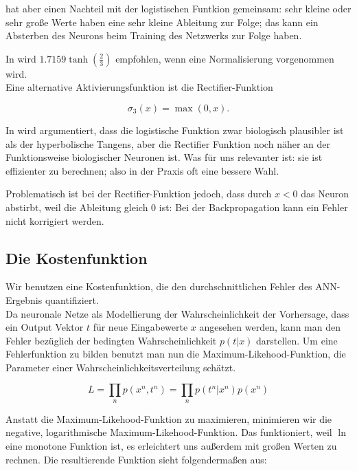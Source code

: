 hat aber einen Nachteil mit der logistischen Funtkion gemeinsam: sehr kleine oder sehr große Werte haben eine sehr kleine Ableitung zur Folge; das kann ein Absterben des Neurons beim Training des Netzwerks zur Folge haben. 

In \cite{lecunefficient} wird $1.7159 \tanh(\frac{2}{3})$ empfohlen, wenn eine Normalisierung vorgenommen wird. \\

Eine alternative Aktivierungsfunktion ist die Rectifier-Funktion 

\begin{equation}
\sigma_3(x) = \max(0,x).
\end{equation} 

In \cite{glorot2011deep} wird argumentiert, dass die logistische Funktion zwar biologisch plausibler ist als der hyperbolische Tangens, aber die Rectifier Funktion noch näher an der Funktionsweise biologischer Neuronen ist. Was für uns relevanter ist: sie ist effizienter zu berechnen; also in der Praxis oft eine bessere Wahl. 

Problematisch ist bei der Rectifier-Funktion jedoch, dass durch $x < 0$ das Neuron abstirbt, weil die Ableitung gleich 0 ist: Bei der Backpropagation kann ein Fehler nicht korrigiert werden\cite{bengio2012practical}.


\subsection{Die Kostenfunktion}
Wir benutzen eine Kostenfunktion, die den durchschnittlichen Fehler des ANN-Ergebnis quantifiziert.\\

Da neuronale Netze als Modellierung der Wahrscheinlichkeit der Vorhersage, dass ein Output Vektor $t$ für neue Eingabewerte $x$ angesehen werden, kann man den Fehler bezüglich der bedingten Wahrscheinlichkeit $p(t|x)$ darstellen. 
Um eine Fehlerfunktion zu bilden benutzt man nun die Maximum-Likehood-Funktion, die Parameter einer Wahrscheinlichkeitsverteilung schätzt. 

\begin{equation}
L = \prod_n p(x^n, t^n) = \prod_n p(t^n|x^n) p(x^n) 
\end{equation}

Anstatt die Maximum-Likehood-Funktion zu maximieren, minimieren wir die negative, logarithmische Maximum-Likehood-Funktion. Das funktioniert, weil $\ln$ eine monotone Funktion ist, es erleichtert uns außerdem mit großen Werten zu rechnen. Die resultierende Funktion sieht folgendermaßen aus:

